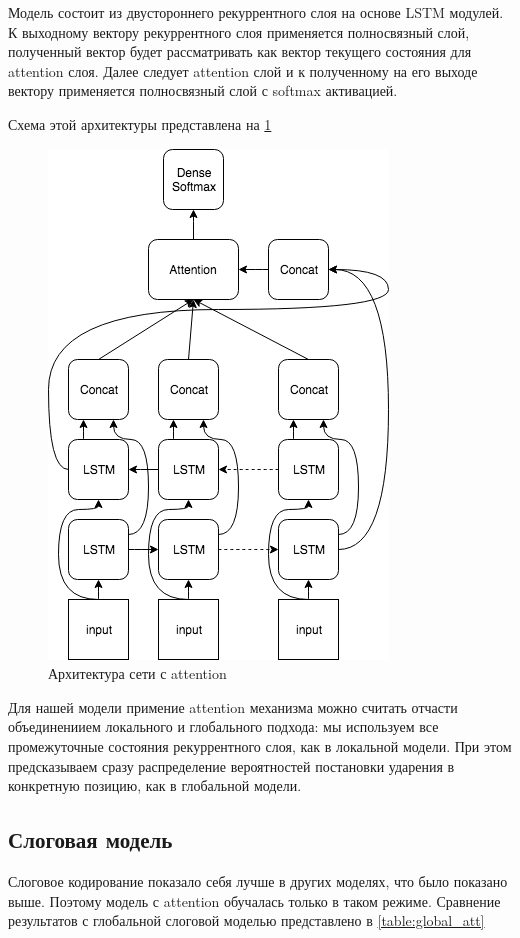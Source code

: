 \documentclass[14pt, a4paper, russian]{extreport}
\begin{document}
Модель состоит из двустороннего рекуррентного слоя на основе LSTM модулей. К выходному вектору рекуррентного слоя применяется полносвязный слой, полученный вектор будет рассматривать как вектор текущего состояния для attention слоя. Далее следует attention слой и к полученному на его выходе вектору применяется полносвязный слой с softmax активацией.

Схема этой архитектуры представлена на \cref{fig:att}

\begin{figure}[H]
	\begin{center}
		\includegraphics[width=0.5\linewidth]{Attention}
	\end{center}
	\caption{\small{Архитектура сети с attention}}
	\label{fig:att}
\end{figure}


Для нашей модели примение attention механизма можно считать отчасти объединениием локального и глобального подхода: мы используем все промежуточные состояния рекуррентного слоя, как в локальной модели. При этом предсказываем сразу распределение вероятностей постановки ударения в конкретную позицию, как в глобальной модели.
\subsection{Слоговая модель}
Слоговое кодирование показало себя лучше в других моделях, что было показано выше. Поэтому модель с attention обучалась только в таком режиме. Сравнение результатов с глобальной слоговой моделью представлено в \cref{table:global_att}
\end{document}

